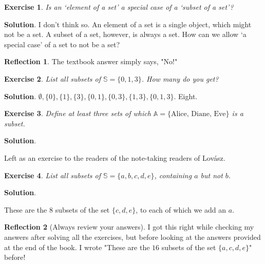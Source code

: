 \documentclass[11pt]{book}
\theoremstyle{definition}
\theoremstyle{plain}
\newtheorem{exercise}{Exercise}
\theoremstyle{definition}
\theoremstyle{problemstyle}
\theoremstyle{remark}
\theoremstyle{definition}
\newtheorem{reflection}{Reflection}
\begin{document}
\begin{exercise}
    Is an `element of a set' a special case of a `subset of a set'?
    \label{ex:1.2.5}
\end{exercise}
\textbf{Solution}.
I don't think so. An element of a set is a single object, which might not be a set. A subset of a set, however, is always a set. How can we allow `a special case' of a set to not be a set?
\begin{reflection}
    The textbook answer simply says, "No!"
\end{reflection}
\begin{exercise}
    List all subsets of $\mathbb{S}=\{0,1,3\}$. How many do you get?
    \label{ex:1.2.6}
\end{exercise}
\textbf{Solution}.
$\emptyset,\{0\},\{1\},\{3\},\{0,1\},\{0,3\},\{1,3\},\{0,1,3\}$. Eight.
\begin{exercise}
    Define at least three sets of which $\mathbb{A}=\{\text{Alice, Diane, Eve}\}$ is a subset.
    \label{ex:1.2.7}
\end{exercise}
\textbf{Solution}. 

Left as an exercise to the readers of the note-taking readers of Lov\'asz.
\begin{exercise}
    List all subsets of $\mathbb{S}=\{a,b,c,d,e\}$, containing $a$ but not $b$.
    \label{ex:1.2.8}
\end{exercise}
\textbf{Solution}. 

These are the $8$ subsets of the set $\{c,d,e\}$, to each of which we add an $a$.
\begin{reflection}[Always review your answers]
    I got this right while checking my answers after solving all the exercises, but before looking at the answers provided at the end of the book. I wrote "These are the $16$ subsets of the set $\{a,c,d,e\}$" before!
\end{reflection}
\end{document}
